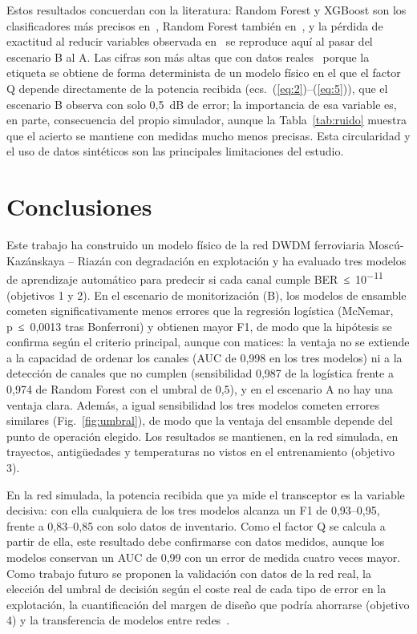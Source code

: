 \documentclass[runningheads]{llncs}
\begin{document}
Estos resultados concuerdan con la literatura: Random Forest y XGBoost son los clasificadores más precisos en~\cite{kozdrowski2021}, Random Forest también en~\cite{rottondi2018}, y la pérdida de exactitud al reducir variables observada en~\cite{aladin2020} se reproduce aquí al pasar del escenario B al A. Las cifras son más altas que con datos reales~\cite{kozdrowski2021} porque la etiqueta se obtiene de forma determinista de un modelo físico en el que el factor Q depende directamente de la potencia recibida (ecs.~(\ref{eq:2})--(\ref{eq:5})), que el escenario B observa con solo 0,5~dB de error; la importancia de esa variable es, en parte, consecuencia del propio simulador, aunque la Tabla~\ref{tab:ruido} muestra que el acierto se mantiene con medidas mucho menos precisas. Esta circularidad y el uso de datos sintéticos son las principales limitaciones del estudio.


\section{Conclusiones}\label{sec:4}

Este trabajo ha construido un modelo físico de la red DWDM ferroviaria Moscú-Kazánskaya – Riazán con degradación en explotación y ha evaluado tres modelos de aprendizaje automático para predecir si cada canal cumple BER~≤~10\textsuperscript{−11} (objetivos 1 y 2). En el escenario de monitorización (B), los modelos de ensamble cometen significativamente menos errores que la regresión logística (McNemar, p~≤~0,0013 tras Bonferroni) y obtienen mayor F1, de modo que la hipótesis se confirma según el criterio principal, aunque con matices: la ventaja no se extiende a la capacidad de ordenar los canales (AUC de 0,998 en los tres modelos) ni a la detección de canales que no cumplen (sensibilidad 0,987 de la logística frente a 0,974 de Random Forest con el umbral de 0,5), y en el escenario A no hay una ventaja clara. Además, a igual sensibilidad los tres modelos cometen errores similares (Fig.~\ref{fig:umbral}), de modo que la ventaja del ensamble depende del punto de operación elegido. Los resultados se mantienen, en la red simulada, en trayectos, antigüedades y temperaturas no vistos en el entrenamiento (objetivo 3).

En la red simulada, la potencia recibida que ya mide el transceptor es la variable decisiva: con ella cualquiera de los tres modelos alcanza un F1 de 0,93–0,95, frente a 0,83–0,85 con solo datos de inventario. Como el factor Q se calcula a partir de ella, este resultado debe confirmarse con datos medidos, aunque los modelos conservan un AUC de 0,99 con un error de medida cuatro veces mayor. Como trabajo futuro se proponen la validación con datos de la red real, la elección del umbral de decisión según el coste real de cada tipo de error en la explotación, la cuantificación del margen de diseño que podría ahorrarse (objetivo 4) y la transferencia de modelos entre redes~\cite{yu2019}.




\end{document}
